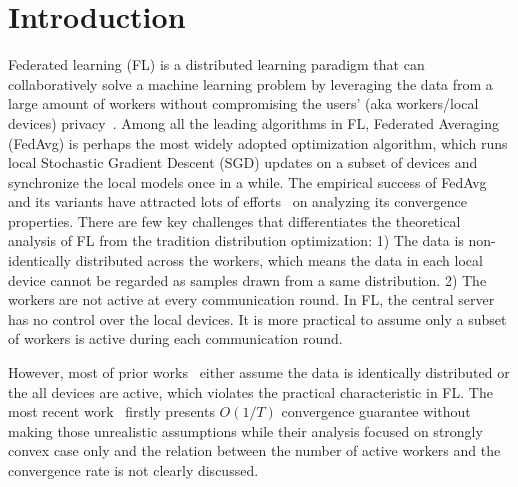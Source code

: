 

\section{Introduction}
Federated learning (FL) is a distributed learning paradigm that can collaboratively solve a machine learning problem by leveraging the data
from a large amount of workers without compromising the users' (aka workers/local devices) privacy~\cite{kairouz2019advances}. 
Among all the leading algorithms in FL, Federated Averaging~\cite{mcmahan2016communication} (FedAvg)
is perhaps the most widely adopted optimization algorithm, which runs local
Stochastic Gradient Descent (SGD) updates on a subset of devices
and synchronize the local models once in a while. 
The empirical success of FedAvg and its variants have
attracted lots of efforts~\cite{li2018federated,stich2018local,khaled2019first,yu2019parallel,haddadpour2019convergence,li2019convergence,huo2020faster} on analyzing its convergence properties. 
There are few key challenges that differentiates the theoretical analysis
of FL from the tradition distribution optimization: 
1) The data is non-identically distributed across the workers, which means the
data in each local device cannot be regarded as samples drawn from
a same distribution. 
2) The workers are not active at every communication
round. In FL, the central server has no control over the local devices. 
It is more practical to assume only a subset of workers is active during
each communication round. 

However, most of prior works~\cite{li2018federated,stich2018local,khaled2019first,yu2019parallel,haddadpour2019convergence} either assume
the data is identically distributed or the all devices are active, which
violates the practical characteristic in FL. The most recent work~\cite{li2019convergence} firstly presents $O(1/T)$ convergence guarantee without 
making those unrealistic assumptions while their analysis focused 
on strongly convex case only and the relation between the number of active
workers and the convergence rate is not clearly discussed. 

